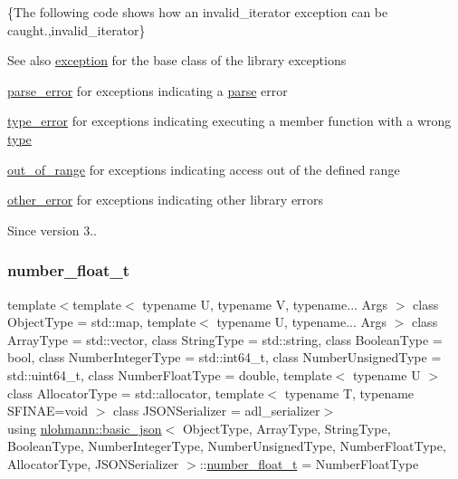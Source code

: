 \{The following code shows how an {\ttfamily invalid\+\_\+iterator} exception can be caught.,invalid\+\_\+iterator\}

\begin{DoxySeeAlso}{See also}
\mbox{\hyperlink{classnlohmann_1_1basic__json_a9a0aced019cb1d65bb49703406c84970}{exception}} for the base class of the library exceptions 

\mbox{\hyperlink{classnlohmann_1_1basic__json_af1efc2468e6022be6e35fc2944cabe4d}{parse\+\_\+error}} for exceptions indicating a \mbox{\hyperlink{classnlohmann_1_1basic__json_aa9676414f2e36383c4b181fe856aa3c0}{parse}} error 

\mbox{\hyperlink{classnlohmann_1_1basic__json_a4010e8e268fefd86da773c10318f2902}{type\+\_\+error}} for exceptions indicating executing a member function with a wrong \mbox{\hyperlink{classnlohmann_1_1basic__json_a2b2d781d7f2a4ee41bc0016e931cadf7}{type}} 

\mbox{\hyperlink{classnlohmann_1_1basic__json_a28f7c2f087274a0012eb7a2333ee1580}{out\+\_\+of\+\_\+range}} for exceptions indicating access out of the defined range 

\mbox{\hyperlink{classnlohmann_1_1basic__json_a3333a5a8714912adda33a35b369f7b3d}{other\+\_\+error}} for exceptions indicating other library errors
\end{DoxySeeAlso}
\begin{DoxySince}{Since}
version 3.. 
\end{DoxySince}
\mbox{\label{classnlohmann_1_1basic__json_a88d6103cb3620410b35200ee8e313d97}} 
\subsubsection{\texorpdfstring{number\+\_\+float\+\_\+t}{number\_float\_t}}
{\footnotesize\ttfamily template$<$template$<$ typename U, typename V, typename... Args $>$ class Object\+Type = std\+::map, template$<$ typename U, typename... Args $>$ class Array\+Type = std\+::vector, class String\+Type  = std\+::string, class Boolean\+Type  = bool, class Number\+Integer\+Type  = std\+::int64\+\_\+t, class Number\+Unsigned\+Type  = std\+::uint64\+\_\+t, class Number\+Float\+Type  = double, template$<$ typename U $>$ class Allocator\+Type = std\+::allocator, template$<$ typename T, typename S\+F\+I\+N\+A\+E=void $>$ class J\+S\+O\+N\+Serializer = adl\+\_\+serializer$>$ \\
using \mbox{\hyperlink{classnlohmann_1_1basic__json}{nlohmann\+::basic\+\_\+json}}$<$ Object\+Type, Array\+Type, String\+Type, Boolean\+Type, Number\+Integer\+Type, Number\+Unsigned\+Type, Number\+Float\+Type, Allocator\+Type, J\+S\+O\+N\+Serializer $>$\+::\mbox{\hyperlink{classnlohmann_1_1basic__json_a88d6103cb3620410b35200ee8e313d97}{number\+\_\+float\+\_\+t}} =  Number\+Float\+Type}



